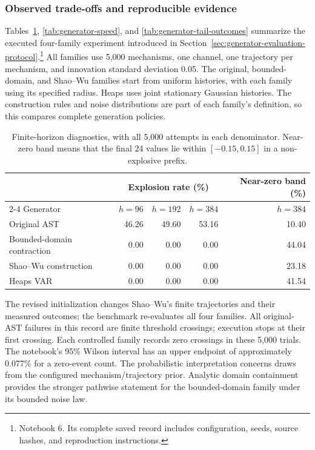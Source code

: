 \subsubsection{Observed trade-offs and reproducible evidence}
\label{sec:implemented-generator-results}

Tables~\ref{tab:generator-outcomes}, \ref{tab:generator-speed}, and
\ref{tab:generator-tail-outcomes} summarize
the executed four-family experiment introduced in
Section~\ref{sec:generator-evaluation-protocol}.\footnote{Notebook 6. Its
complete saved record includes configuration, seeds, source hashes, and
reproduction instructions.}
All families use 5,000 mechanisms, one channel, one trajectory per mechanism,
and innovation standard deviation 0.05. The original, bounded-domain, and
Shao--Wu families start from uniform histories, with each family using its
specified radius. Heaps uses joint stationary Gaussian histories. The construction rules and
noise distributions are part of each family's definition, so this compares
complete generation policies.

\begin{table}[H]
\centering\small
\begin{tabular}{@{}lrrrr@{}}
\toprule
& \multicolumn{3}{c}{Explosion rate (\%)} & Near-zero band (\%) \\
\cmidrule(lr){2-4}
Generator & $h=96$ & $h=192$ & $h=384$ & $h=384$ \\
\midrule
Original AST & 46.26 & 49.60 & 53.16 & 10.40 \\
Bounded-domain contraction & 0.00 & 0.00 & 0.00 & 44.04 \\
Shao--Wu construction & 0.00 & 0.00 & 0.00 & 23.18 \\
Heaps VAR & 0.00 & 0.00 & 0.00 & 41.54 \\
\bottomrule
\end{tabular}
\caption{Finite-horizon diagnostics, with all 5,000 attempts in each
denominator. Near-zero band means that the final 24 values lie within
$[-0.15,0.15]$ in a non-explosive prefix.}
\label{tab:generator-outcomes}
\end{table}

The revised initialization changes Shao--Wu's finite trajectories and their
measured outcomes; the benchmark re-evaluates all four families.
All original-AST failures in this record are finite threshold crossings;
execution stops at their first crossing. Each controlled
family records zero crossings in these 5,000 trials. The notebook's 95\%
Wilson interval has an upper endpoint of approximately 0.077\% for a
zero-event count. The probabilistic interpretation concerns draws from the
configured mechanism/trajectory prior. Analytic domain containment provides
the stronger pathwise statement for the bounded-domain family under its
bounded noise law.

